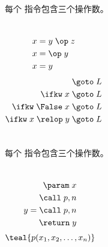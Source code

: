 
\begin{frame}{}
  \begin{center}
    \begin{definition}
      每个  指令包含三个操作数。
    \end{definition}

    \vspace{0.80cm}
    \begin{columns}
        \begin{align}
          x &= y \;\op\; z \\
          x &= \op\; y \\
          x &= y
        \end{align}
        \pause
        \begin{align}
          \goto\; L \\
          \ifkw\; x \;\goto\; L \\
          \ifkw\; \False\; x \;\goto\; L \\
          \ifkw\; x \;\relop\; y \;\goto\; L
        \end{align}
    \end{columns}
  \end{center}
\end{frame}

\begin{frame}{}
  \begin{center}
    \begin{definition}
      每个  指令包含三个操作数。
    \end{definition}

    \vspace{0.80cm}
    \begin{columns}
        \begin{align}
          \param\; x \\
          \call\; p, n \\
          y = \call\; p, n \\
          \return\; y
        \end{align}
        \[
          \teal{p(x_{1}, x_{2}, \dots, x_{n})}
        \]
    \end{columns}
  \end{center}
\end{frame}

